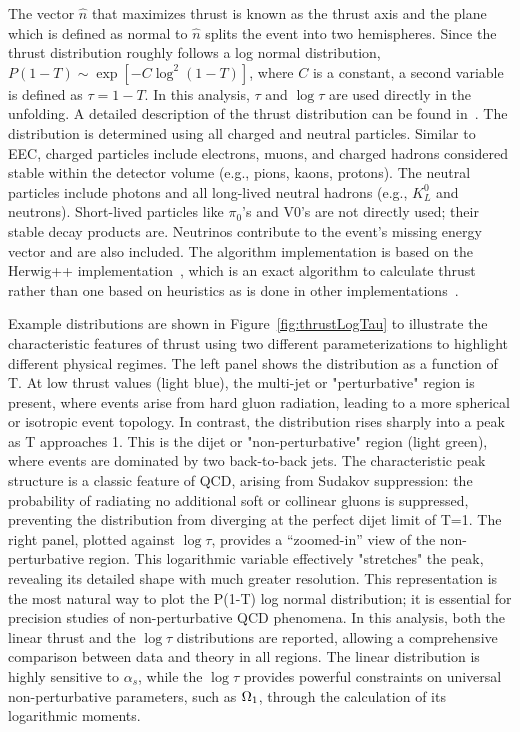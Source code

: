 \documentclass[a4paper,11pt]{article}
\begin{document}
The vector $\hat{n}$ that maximizes thrust is known as the thrust axis and the plane which is defined as normal to $\hat{n}$ splits the event into two hemispheres. 
Since the thrust distribution roughly follows a log normal distribution, $P(1 - T) \sim \exp \left[-C \log^2(1 - T)\right]$, where $C$ is a constant, a second variable is defined as $\tau = 1 - T$. 
In this analysis, $\tau$ and $\log \tau$ are used directly in the unfolding. 
A detailed description of the thrust distribution can be found in~\cite{Abbate:2010xh, Benitez:2024nav, Becher:2008cf}. 
The distribution is determined using all charged and neutral particles. 
Similar to EEC, charged particles include electrons, muons, and charged hadrons considered stable within the detector volume (e.g., pions, kaons, protons).
The neutral particles include photons and all long-lived neutral hadrons (e.g., $K^0_L$ and neutrons). 
Short-lived particles like $\pi_0$'s and V0's are not directly used; their stable decay products are. 
Neutrinos contribute to the event's missing energy vector and are also included.
The algorithm implementation is based on the Herwig++ implementation~\cite{Brandt:1978zm, B_hr_2008, rivet_thrust, BUCKLEY20132803}, which is an exact algorithm to calculate thrust rather than one based on heuristics as is done in other implementations~\cite{Belle2Thrust}.

Example distributions are shown in Figure~\ref{fig:thrustLogTau} to illustrate the characteristic features of thrust using two different parameterizations to highlight different physical regimes. 
The left panel shows the distribution as a function of T.
At low thrust values (light blue), the multi-jet or "perturbative" region is present, where events arise from hard gluon radiation, leading to a more spherical or isotropic event topology.
In contrast, the distribution rises sharply into a peak as T approaches 1. 
This is the dijet or "non-perturbative" region (light green), where events are dominated by two back-to-back jets. The characteristic peak structure is a classic feature of QCD, arising from Sudakov suppression: the probability of radiating no additional soft or collinear gluons is suppressed, preventing the distribution from diverging at the perfect dijet limit of T=1.
The right panel, plotted against $\log \tau$, provides a ``zoomed-in'' view of the non-perturbative region. This logarithmic variable effectively "stretches" the peak, revealing its detailed shape with much greater resolution. This representation is the most natural way to plot the P(1-T) log normal distribution; it is essential for precision studies of non-perturbative QCD phenomena.
In this analysis, both the linear thrust and the $\log \tau$ distributions are reported, allowing a comprehensive comparison between data and theory in all regions. 
The linear distribution is highly sensitive to $\alpha_s$, while the $\log \tau$ provides powerful constraints on universal non-perturbative parameters, such as $\rm \Omega_{1}$, through the calculation of its logarithmic moments. 
\end{document}
